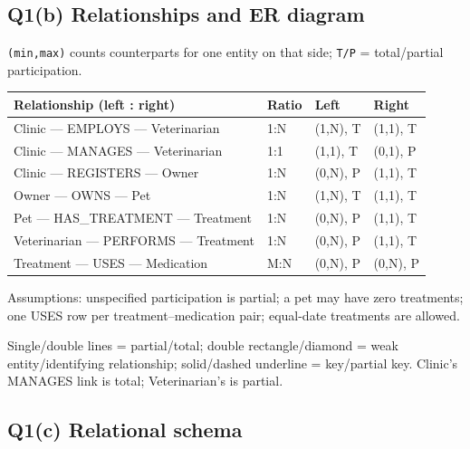 \subsection{Q1(b) Relationships and ER diagram}\label{tutorial1_answers-q1b-relationships-and-er-diagram}

\texttt{(\allowbreak{}min,\allowbreak{}max)\allowbreak{}} counts counterparts for one entity on that side; \texttt{T/\allowbreak{}P} = total/partial participation.

\begin{longtable}[]{@{}llll@{}}
\toprule\noalign{}
Relationship (left : right) & Ratio & Left & Right \\
\midrule\noalign{}
\endhead
\bottomrule\noalign{}
\endlastfoot
Clinic --- EMPLOYS --- Veterinarian & 1:N & (1,N), T & (1,1), T \\
Clinic --- MANAGES --- Veterinarian & 1:1 & (1,1), T & (0,1), P \\
Clinic --- REGISTERS --- Owner & 1:N & (0,N), P & (1,1), T \\
Owner --- OWNS --- Pet & 1:N & (1,N), T & (1,1), T \\
Pet --- HAS\_TREATMENT --- Treatment & 1:N & (0,N), P & (1,1), T \\
Veterinarian --- PERFORMS --- Treatment & 1:N & (0,N), P & (1,1), T \\
Treatment --- USES --- Medication & M:N & (0,N), P & (0,N), P \\
\end{longtable}


Assumptions: unspecified participation is partial; a pet may have zero treatments; one USES row per treatment--medication pair; equal-date treatments are allowed.

\StudyLandscapeER

Single/double lines = partial/total; double rectangle/diamond = weak entity/identifying relationship; solid/dashed underline = key/partial key. Clinic's MANAGES link is total; Veterinarian's is partial.

\subsection{Q1(c) Relational schema}\label{tutorial1_answers-q1c-relational-schema}

